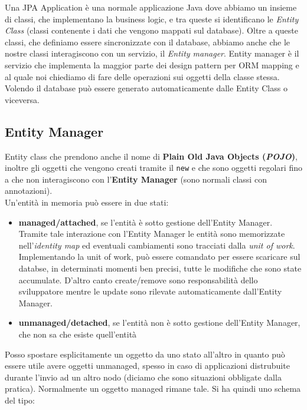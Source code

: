 Una JPA Application è una normale applicazione Java dove abbiamo un insieme di classi, che implementano la business logic, e tra queste si identificano le \textit{Entity Class} (classi contenente i dati che vengono mappati sul database). Oltre a queste classi, che definiamo essere sincronizzate con il database, abbiamo anche che le nostre classi interagiscono con un servizio, il \textit{Entity manager}. Entity manager è il servizio che implementa la maggior parte dei design pattern per ORM mapping e al quale noi chiediamo di fare delle operazioni sui oggetti della classe stessa. Volendo il database può essere generato automaticamente dalle Entity Class o viceversa.

\subsection{Entity Manager}
Entity class che prendono anche il nome di \textbf{Plain Old Java Objects (\textit{POJO})}, inoltre gli oggetti che vengono creati tramite il \texttt{new} e che sono oggetti regolari fino a che non interagiscono con l'\textbf{Entity Manager} (sono normali classi con annotazioni).\\ 
Un'entità in memoria può essere in due stati:
\begin{itemize}
    \item \textbf{managed/attached}, se l'entità è sotto gestione dell'Entity Manager. Tramite tale interazione con l'Entity Manager le entità sono memorizzate nell'\textit{identity map} ed eventuali cambiamenti sono tracciati dalla \textit{unit of work}. Implementando la unit of work, può essere comandato per essere scaricare sul databse, in determinati momenti ben precisi, tutte le modifiche che sono state accumulate. D'altro canto create/remove sono responsabilità dello sviluppatore mentre le update sono rilevate automaticamente dall'Entity Manager.
    \item \textbf{unmanaged/detached}, se l'entità non è sotto gestione dell'Entity Manager, che non sa che esiste quell'entità
\end{itemize}
Posso spostare esplicitamente un oggetto da uno stato all'altro in quanto può essere utile avere oggetti unmanaged, spesso in caso di applicazioni distrubuite durante l'invio ad un altro nodo (diciamo che sono situazioni obbligate dalla pratica). Normalmente un oggetto managed rimane tale.
Si ha quindi uno schema del tipo:
